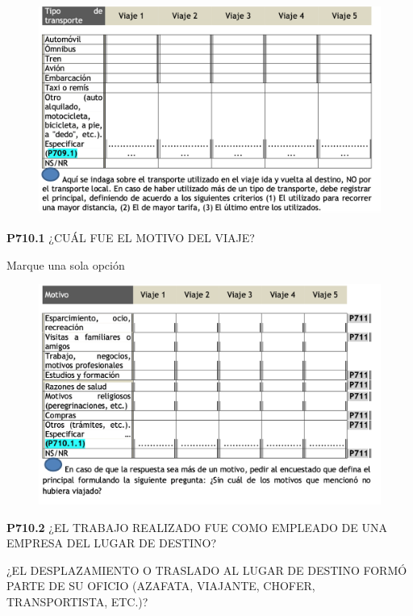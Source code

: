 \documentclass[
  openany]{book}
\begin{document}
\begin{figure}

{\centering \includegraphics[width=1\linewidth]{imagenes/figura6-243} 

}

\end{figure}

\textbf{P710.1} ¿CUÁL FUE EL MOTIVO DEL VIAJE?

Marque una sola opción

\begin{figure}

{\centering \includegraphics[width=1\linewidth]{imagenes/figura6-244} 

}

\end{figure}

\textbf{P710.2} ¿EL TRABAJO REALIZADO FUE COMO EMPLEADO DE UNA EMPRESA DEL LUGAR DE DESTINO?

¿EL DESPLAZAMIENTO O TRASLADO AL LUGAR DE DESTINO FORMÓ PARTE DE SU OFICIO (AZAFATA, VIAJANTE, CHOFER, TRANSPORTISTA, ETC.)?
\end{document}
